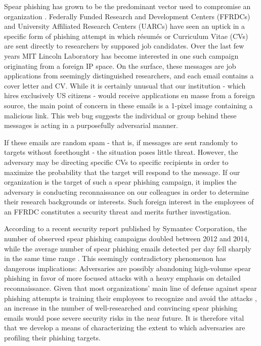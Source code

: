 \documentclass[conference]{IEEEtran}
\begin{document}
\IEEEpeerreviewmaketitle






Spear phishing has grown to be the predominant vector used to compromise an organization \cite{grow2011special}.  Federally Funded Research and Development Centers (FFRDCs) and University Affiliated 
Research Centers (UARCs) have seen an uptick in a specific form of phishing attempt in which r\'esum\'es or Curriculum Vitae (CVs) are sent directly to researchers by supposed job candidates.  Over the last few years 
MIT Lincoln Laboratory has become interested in one such campaign originating from a foreign IP space.  On the surface, these messages are job applications from seemingly distinguished researchers, and 
each email contains a cover letter and CV.  While it is certainly unusual that our institution - which hires exclusively US citizens - would receive applications en masse from a foreign source, the main 
point of concern in these emails is a 1-pixel image containing a malicious link.  This web bug suggests the individual or group behind these messages 
is acting in a purposefully adversarial manner.

If these emails are random spam - that is, if messages are sent randomly to targets without forethought - the situation poses little threat.  However, the adversary may be directing specific CVs to 
specific recipients in order to maximize the probability that the target will respond to the message.  If our organization is the target of such a spear phishing 
campaign, it implies the adversary is conducting reconnaissance on our colleagues in order to determine their research backgrounds or interests.  Such foreign interest in the employees of an FFRDC constitutes a security threat and merits further investigation.

According to a recent 
security report published by Symantec Corporation, the number of observed spear phishing campaigns doubled between 2012 and 2014, while the average 
number of spear phishing emails detected per day fell sharply in the same time range \cite{symantec}.  This seemingly contradictory phenomenon 
has dangerous implications:  Adversaries are possibly abandoning high-volume spear phishing in favor of more focused attacks with a heavy emphasis on detailed 
reconnaissance.  Given that most organizations' main line of defense against spear phishing attempts is training their employees to 
recognize and avoid the attacks \cite{kumaraguru2008lessons, song2014study}, an increase in the number of well-researched and convincing spear phishing 
emails would pose severe security risks in the near future.  It is therefore vital that we develop a means of characterizing the extent to which adversaries 
are profiling their phishing targets.
\end{document}
